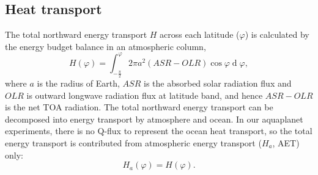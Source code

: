 \subsection{Heat transport}
\label{sec:heat_transport}

 
The total northward energy transport $H$ across each latitude ($\varphi$) is calculated by the energy budget balance in an atmospheric column,
\begin{equation}
	H(\varphi) =  \int_{-\frac{\pi}{2}}^{\varphi}2\pi a^2(ASR-OLR)\operatorname{cos}\varphi \operatorname{d}\varphi,
\end{equation}  
where $a$ is the radius of Earth, $ASR$ is the absorbed solar radiation flux and $OLR$ is outward longwave radiation flux at latitude band, and hence $ASR-OLR$ is the net TOA radiation. The total northward energy transport can be decomposed into energy transport by atmosphere and ocean. In our aquaplanet experiments, there is no Q-flux to represent the ocean heat transport, so the total energy transport is contributed from atmospheric energy transport ($H_{a}$, AET) only:
\begin{equation}
	H_a(\varphi) = H(\varphi).
\end{equation}

